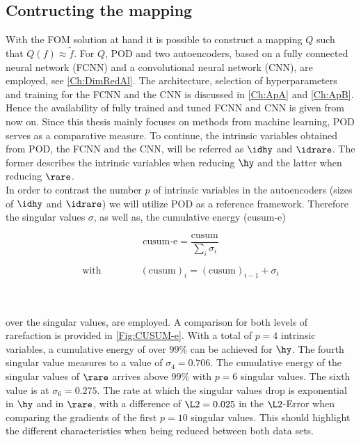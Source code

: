\subsection{Contructing the mapping}
With the FOM solution at hand it is possible to construct a mapping \(Q\) such that \(Q(f)\approx \tilde{f}\). For \(Q\), POD and two autoencoders, based on a fully connected neural network (FCNN) and a convolutional neural network (CNN), are employed, see \cref{Ch:DimRedAl}. The architecture, selection of hyperparameters and training for the FCNN and the CNN is discussed in \cref{Ch:ApA} and \cref{Ch:ApB}. Hence the availability of fully trained and tuned FCNN and CNN is given from now on. Since this thesis mainly focuses on methods from machine learning, POD serves as a comparative measure. To continue, the intrinsic variables obtained from POD, the FCNN and the CNN, will be referred as \(\idhy\) and \(\idrare\). The former describes the intrinsic variables when reducing \(\hy\) and the latter when reducing \(\rare\).\\
In order to contrast the number \(p\) of intrinsic variables in the autoencoders (sizes of \(\idhy\) and \(\idrare\)) we will utilize POD as a reference framework. Therefore the singular values \(\sigma\), as well as, the cumulative energy (cusum-e)\\
\noindent \begin{minipage}{.3\linewidth}
	\begin{equation}
	\textrm{cusum-e} = \frac{\textrm{cusum}}{\sum_i \sigma_i}
	\end{equation}
\end{minipage}%
\begin{minipage}{.7\linewidth}
	\begin{equation}
			\textrm{with} \qquad\qquad(\textrm{cusum})_i =(\text{cusum})_{i-1} + \sigma_{i}
	\end{equation}
\end{minipage}\\\\
over the singular values, are employed. A comparison for both levels of rarefaction is provided in \cref{Fig:CUSUM-e}. With a total of \(p=4\) intrinsic variables, a cumulative energy of over \(99\%\) can be achieved for \(\hy\). The fourth singular value measures to a value of \(\sigma_4 = 0.706\). The cumulative energy of the singular values of \(\rare\) arrives above \(99\%\) with \(p=6\) singular values. The sixth value is at \(\sigma_6 = 0.275\). The rate at which the singular values drop is exponential in \(\hy\) and in \(\rare\), with a difference of \(\L2 = 0.025\) in the \(\L2\)-Error when comparing the gradients of the first \(p=10\) singular values. This should highlight the different characteristics when being reduced between both data sets.\\
